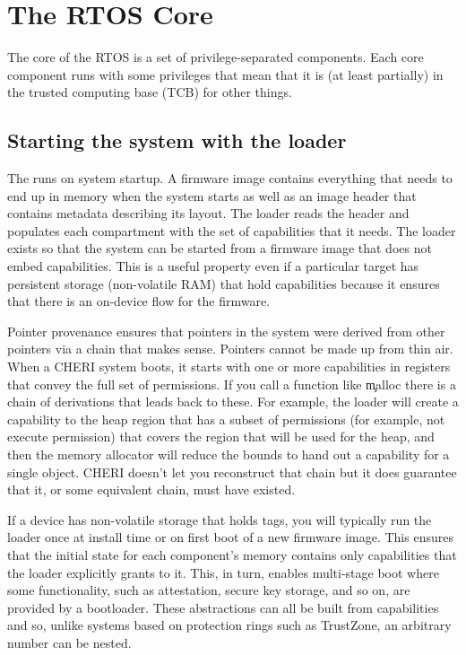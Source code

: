 \chapter{The RTOS Core}

The core of the RTOS is a set of privilege-separated components.
Each core component runs with some privileges that mean that it is (at least partially) in the trusted computing base (TCB) for other things.

\section{Starting the system with the loader}

The  runs on system startup.
A firmware image contains everything that needs to end up in memory when the system starts as well as an image header that contains metadata describing its layout.
The loader reads the header and populates each compartment with the set of capabilities that it needs.
The loader exists so that the system can be started from a firmware image that does not embed capabilities.
This is a useful property even if a particular target has persistent storage (non-volatile RAM) that  hold capabilities because it ensures that there is an on-device  flow for the firmware.

Pointer provenance ensures that pointers in the system were derived from other pointers via a chain that makes sense.
Pointers cannot be made up from thin air.
When a CHERI system boots, it starts with one or more capabilities in registers that convey the full set of permissions.
If you call a function like \c{malloc} there is a chain of derivations that leads back to these.
For example, the loader will create a capability to the heap region that has a subset of permissions (for example, not execute permission) that covers the region that will be used for the heap, and then the memory allocator will reduce the bounds to hand out a capability for a single object.
CHERI doesn't let you reconstruct that chain but it does guarantee that it, or some equivalent chain, must have existed.

If a device has non-volatile storage that holds tags, you will typically run the loader once at install time or on first boot of a new firmware image.
This ensures that the initial state for each component's memory contains only capabilities that the loader explicitly grants to it.
This, in turn, enables multi-stage boot where some functionality, such as attestation, secure key storage, and so on, are provided by a bootloader.
These abstractions can all be built from capabilities and so, unlike systems based on protection rings such as TrustZone, an arbitrary number can be nested.


